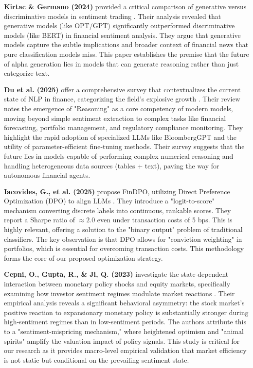 \documentclass[12pt, a4paper]{report}
\begin{document}
\textbf{Kirtac \& Germano (2024)} provided a critical comparison of generative versus discriminative models in sentiment trading \cite{kirtac2024}. Their analysis revealed that generative models (like OPT/GPT) significantly outperformed discriminative models (like BERT) in financial sentiment analysis. They argue that generative models capture the subtle implications and broader context of financial news that pure classification models miss. This paper establishes the premise that the future of alpha generation lies in models that can generate reasoning rather than just categorize text.

\textbf{Du et al. (2025)} offer a comprehensive survey that contextualizes the current state of NLP in finance, categorizing the field's explosive growth \cite{du2025}. Their review notes the emergence of "Reasoning" as a core competency of modern models, moving beyond simple sentiment extraction to complex tasks like financial forecasting, portfolio management, and regulatory compliance monitoring. They highlight the rapid adoption of specialized LLMs like BloombergGPT and the utility of parameter-efficient fine-tuning methods. Their survey suggests that the future lies in models capable of performing complex numerical reasoning and handling heterogeneous data sources (tables + text), paving the way for autonomous financial agents.

\textbf{Iacovides, G., et al. (2025)} propose FinDPO, utilizing Direct Preference Optimization (DPO) to align LLMs \cite{iacovides2025}. They introduce a "logit-to-score" mechanism converting discrete labels into continuous, rankable scores. They report a Sharpe ratio of $\approx 2.0$ even under transaction costs of 5 bps. This is highly relevant, offering a solution to the "binary output" problem of traditional classifiers. The key observation is that DPO allows for "conviction weighting" in portfolios, which is essential for overcoming transaction costs. This methodology forms the core of our proposed optimization strategy.

\textbf{Cepni, O., Gupta, R., \& Ji, Q. (2023)} investigate the state-dependent interaction between monetary policy shocks and equity markets, specifically examining how investor sentiment regimes modulate market reactions \cite{cepni2023}. Their empirical analysis reveals a significant behavioral asymmetry: the stock market’s positive reaction to expansionary monetary policy is substantially stronger during high-sentiment regimes than in low-sentiment periods. The authors attribute this to a "sentiment-mispricing mechanism," where heightened optimism and "animal spirits" amplify the valuation impact of policy signals. This study is critical for our research as it provides macro-level empirical validation that market efficiency is not static but conditional on the prevailing sentiment state.
\end{document}
